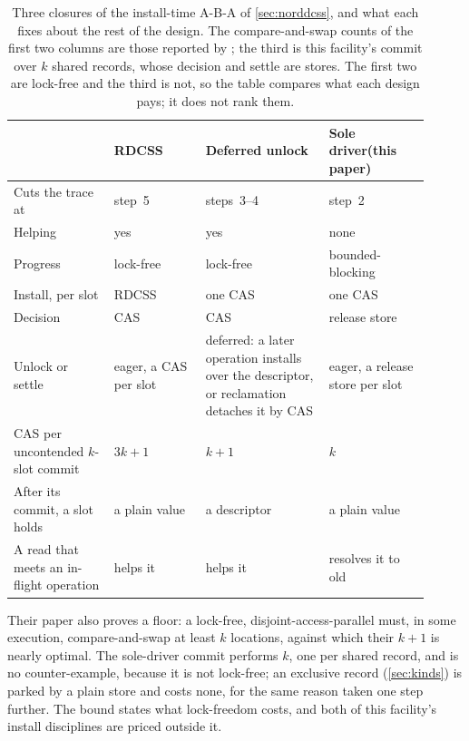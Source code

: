 \documentclass[11pt]{article}
\begin{document}
\begin{table}[t]
\centering
\footnotesize
\setlength{\tabcolsep}{4pt}
\begin{tabular}{@{}p{0.22\linewidth} p{0.20\linewidth} p{0.27\linewidth} p{0.22\linewidth}@{}}
\toprule
 & \textbf{RDCSS}\newline\citep{harris2002mcas}
 & \textbf{Deferred unlock}\newline\citep{guerraoui2020mcas}
 & \textbf{Sole driver}\newline(this paper) \\
\midrule
Cuts the trace at & step~5 & steps~3--4 & step~2 \\
Helping & yes & yes & none \\
Progress & lock-free & lock-free & bounded-blocking \\
Install, per slot & RDCSS & one CAS & one CAS \\
Decision & CAS & CAS & release store \\
Unlock or settle &
  eager, a CAS per slot &
  deferred: a later operation installs over the descriptor, or reclamation
  detaches it by CAS &
  eager, a release store per slot \\
CAS per uncontended $k$-slot commit & $3k+1$ & $k+1$ & $k$ \\
After its commit, a slot holds & a plain value & a descriptor & a plain value \\
A read that meets an in-flight operation & helps it & helps it & resolves it to old \\
\bottomrule
\end{tabular}
\caption{Three closures of the install-time A-B-A of \cref{sec:norddcss}, and
what each fixes about the rest of the design. The compare-and-swap counts of the
first two columns are those reported by \citet{guerraoui2020mcas}; the third is
this facility's commit over $k$ shared records, whose decision and settle are
stores. The first two are lock-free and the third is not, so the table compares
what each design pays; it does not rank them.}
\label{tab:closures}
\end{table}

Their paper also proves a floor: a lock-free, disjoint-access-parallel \kcas
must, in some execution, compare-and-swap at least $k$ locations, against which
their $k+1$ is nearly optimal. The sole-driver commit performs $k$, one per
shared record, and is no counter-example, because it is not lock-free; an
exclusive record (\cref{sec:kinds}) is parked by a plain store and costs none,
for the same reason taken one step further. The bound states what lock-freedom
costs, and both of this facility's install disciplines are priced outside it.
\end{document}
